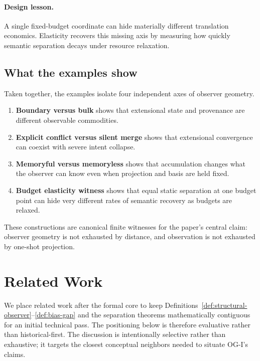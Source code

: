 \documentclass[11pt,twoside]{article}
\theoremstyle{definition}
\begin{document}
\paragraph{Design lesson.}
A single fixed-budget coordinate can hide materially different translation economics. Elasticity recovers this missing axis by measuring how quickly semantic separation decays under resource relaxation.

\subsection{What the examples show}
\label{subsec:examples-summary}

Taken together, the examples isolate four independent axes of observer geometry.

\begin{enumerate}[leftmargin=*]
  \item \textbf{Boundary versus bulk} shows that extensional state and provenance are different observable commodities.
  \item \textbf{Explicit conflict versus silent merge} shows that extensional convergence can coexist with severe intent collapse.
  \item \textbf{Memoryful versus memoryless} shows that accumulation changes what the observer can know even when projection and basis are held fixed.
  \item \textbf{Budget elasticity witness} shows that equal static separation at one budget point can hide very different rates of semantic recovery as budgets are relaxed.
\end{enumerate}

These constructions are canonical finite witnesses for the paper's central claim: observer geometry is not exhausted by distance, and observation is not exhausted by one-shot projection.

\section{Related Work}
\label{sec:related-work}

We place related work after the formal core to keep Definitions~\ref{def:structural-observer}--\ref{def:bias-gap} and the separation theorems mathematically contiguous for an initial technical pass. The positioning below is therefore evaluative rather than historical-first. The discussion is intentionally selective rather than exhaustive; it targets the closest conceptual neighbors needed to situate OG-I's claims.
\end{document}
